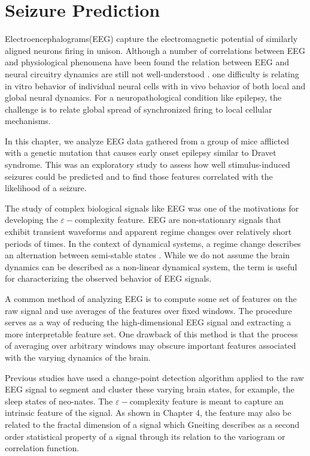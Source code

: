 \chapter{Seizure Prediction}

Electroencephalograms(EEG) capture the electromagnetic 
potential of similarly aligned neurons firing in unison. Although a number of correlations between 
EEG and physiological phenomena have been found the relation between EEG and neural circuitry dynamics are still not well-understood \cite{eeg}. 
one difficulty is relating in vitro behavior of individual neural cells with in vivo behavior of both local and global neural dynamics.  
For a neuropathological condition like epilepsy, 
the challenge is to relate global spread of 
synchronized firing to local cellular mechanisms.

In this chapter, we analyze EEG data gathered 
from a group of mice afflicted with a genetic 
mutation that causes early onset epilepsy similar to 
Dravet syndrome. This was an exploratory study to assess how well stimulus-induced seizures could be predicted and to find those features correlated with the likelihood of a seizure. 

The study of complex biological signals like EEG 
was one of the motivations for developing the 
$\varepsilon-$complexity feature. EEG are non-stationary
signals that exhibit transient waveforms and apparent regime changes over relatively short periods of times. In the context of dynamical systems, a regime change describes an alternation between semi-stable states 
\cite{lorenz2006}. While we do not assume the brain dynamics can be described as a non-linear dynamical system, the term is useful for characterizing the
observed behavior of EEG signals. 

A common method of analyzing EEG is to compute some set of features on the raw signal and use averages of the features over fixed windows. The procedure 
serves as a way of reducing the high-dimensional 
EEG signal and extracting a more interpretable
feature set. One drawback of this method is that the process of averaging over arbitrary windows may obscure important features associated with the varying dynamics of the brain. 

Previous studies have used a change-point detection algorithm applied to the raw EEG signal 
to segment and cluster these varying brain states, 
for example, the sleep states of neo-nates\cite{pirya2009}.
The $\varepsilon-$complexity feature is meant to capture an intrinsic feature of the signal. As shown in 
Chapter 4, the feature may also be related to the 
fractal dimension of a signal which Gneiting describes
as a second order statistical property of 
a signal through its relation to the variogram or 
correlation function\cite{gneiting2012}. 

